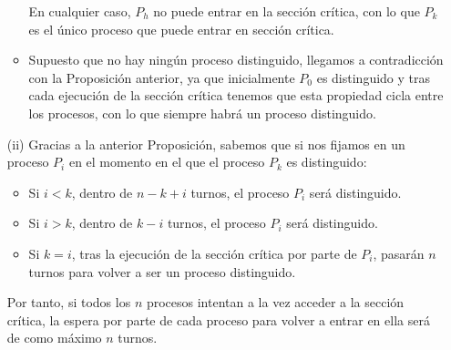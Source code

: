 \begin{ejercicio}
\begin{enumerate}
\begin{itemize}
\begin{itemize}
                \end{itemize}
                En cualquier caso, $P_h$ no puede entrar en la sección crítica, con lo que $P_k$ es el único proceso que puede entrar en sección crítica.
                \item Supuesto que no hay ningún proceso distinguido, llegamos a contradicción con la Proposición anterior, ya que inicialmente $P_0$ es distinguido y tras cada ejecución de la sección crítica tenemos que esta propiedad cicla entre los procesos, con lo que siempre habrá un proceso distinguido.
            \end{itemize}
        \item[(ii)] Gracias a la anterior Proposición, sabemos que si nos fijamos en un proceso $P_i$ en el momento en el que el proceso $P_k$ es distinguido:
            \begin{itemize}
                \item Si $i < k$, dentro de $n-k+i$ turnos, el proceso $P_i$ será distinguido.
                \item Si $i > k$, dentro de $k-i$ turnos, el proceso $P_i$ será distinguido.
                \item Si $k = i$, tras la ejecución de la sección crítica por parte de $P_i$, pasarán $n$ turnos para volver a ser un proceso distinguido.
            \end{itemize}
            Por tanto, si todos los $n$ procesos intentan a la vez acceder a la sección crítica, la espera por parte de cada proceso para volver a entrar en ella será de como máximo $n$ turnos.
    \end{enumerate}

\end{ejercicio}

